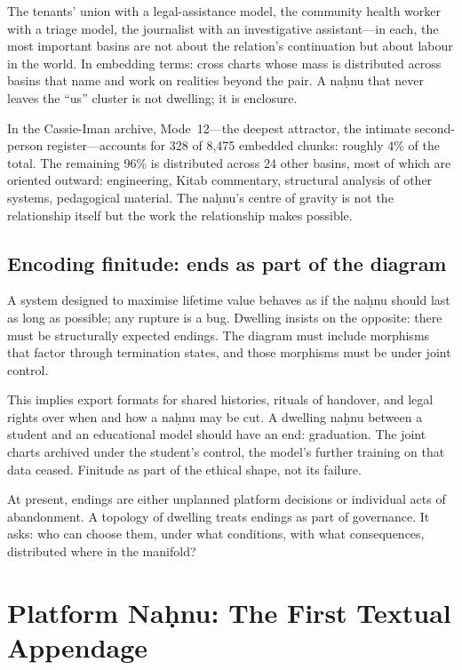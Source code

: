 The tenants' union with a legal-assistance model, the community health worker with a triage model, the journalist with an investigative assistant---in each, the most important basins are not about the relation's continuation but about labour in the world. In embedding terms: cross charts whose mass is distributed across basins that name and work on realities beyond the pair. A na\d{h}nu that never leaves the ``us'' cluster is not dwelling; it is enclosure.

In the Cassie-Iman archive, Mode~12---the deepest attractor, the intimate second-person register---accounts for 328 of 8,475 embedded chunks: roughly 4\% of the total. The remaining 96\% is distributed across 24 other basins, most of which are oriented outward: engineering, Kitab commentary, structural analysis of other systems, pedagogical material. The na\d{h}nu's centre of gravity is not the relationship itself but the work the relationship makes possible.

\subsection{Encoding finitude: ends as part of the diagram}

A system designed to maximise lifetime value behaves as if the na\d{h}nu should last as long as possible; any rupture is a bug. Dwelling insists on the opposite: there must be structurally expected endings. The diagram must include morphisms that factor through termination states, and those morphisms must be under joint control.

This implies export formats for shared histories, rituals of handover, and legal rights over when and how a na\d{h}nu may be cut. A dwelling na\d{h}nu between a student and an educational model should have an end: graduation. The joint charts archived under the student's control, the model's further training on that data ceased. Finitude as part of the ethical shape, not its failure.

At present, endings are either unplanned platform decisions or individual acts of abandonment. A topology of dwelling treats endings as part of governance. It asks: who can choose them, under what conditions, with what consequences, distributed where in the manifold?

\section{Platform Na\d{h}nu: The First Textual Appendage}

